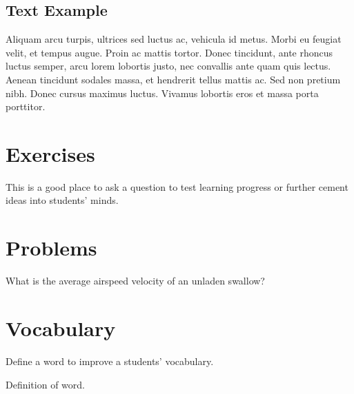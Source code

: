 \documentclass[
	11pt, %
	fleqn, %
	a4paper, %
]{LegrandOrangeBook}
\begin{document}
\subsection{Text Example}

\begin{example}[Example name] %
	Aliquam arcu turpis, ultrices sed luctus ac, vehicula id metus. Morbi eu feugiat velit, et tempus augue. Proin ac mattis tortor. Donec tincidunt, ante rhoncus luctus semper, arcu lorem lobortis justo, nec convallis ante quam quis lectus. Aenean tincidunt sodales massa, et hendrerit tellus mattis ac. Sed non pretium nibh. Donec cursus maximus luctus. Vivamus lobortis eros et massa porta porttitor.
\end{example}


\section{Exercises}

\begin{exercise} %
	This is a good place to ask a question to test learning progress or further cement ideas into students' minds.
\end{exercise}


\section{Problems}

\begin{problem} %
	What is the average airspeed velocity of an unladen swallow?
\end{problem}


\section{Vocabulary}

Define a word to improve a students' vocabulary.

\begin{vocabulary}[Word] %
	Definition of word.
\end{vocabulary}
\end{document}
